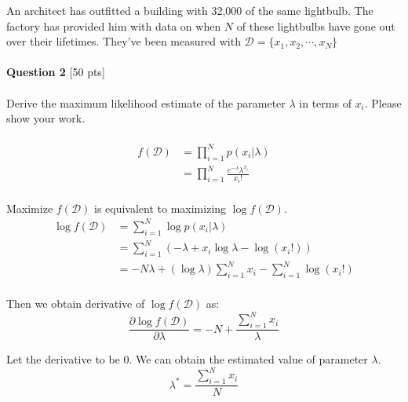 \documentclass[paper=a4, fontsize=11pt]{scrartcl} %
\begin{document}
An architect has outfitted a building with 32,000 of the same lightbulb. The factory has provided him with data on when $N$ of these lightbulbs have gone out over their lifetimes. They've been measured with $\mathcal{D} = \{ x_1, x_2, \cdots, x_N \}$\\
\\
{\Large \textbf{Question 2} [50 pts]} \\
\\
Derive the maximum likelihood estimate of the parameter $\lambda$ in terms of $x_i$. Please show your work. \\
\\
$$
\begin{aligned}
f(\mathcal{D}) &= \prod_{i=1}^{N}p(x_i|\lambda) \\
&= \prod_{i=1}^{N}\frac{e^{-\lambda}\lambda^{x_i}}{x_i!} \\
\end{aligned}
$$

Maximize $f(\mathcal{D})$ is equivalent to maximizing $\log f(\mathcal{D})$.
$$
\begin{aligned}
\log f(\mathcal{D}) &= \sum_{i=1}^{N}\log p(x_i|\lambda) \\
&= \sum_{i=1}^{N}\left( -\lambda + x_i\log\lambda -\log(x_i!) \right) \\
&= -N\lambda + (\log\lambda)\sum_{i=1}^{N}x_i - \sum_{i=1}^{N}\log(x_i!) \\
\end{aligned}
$$

Then we obtain derivative of $\log f(\mathcal{D})$ as:
$$
\frac{\partial \log f(\mathcal{D})}{\partial \lambda} = -N + \frac{\sum_{i=1}^{N}x_i}{\lambda}
$$

Let the derivative to be 0. We can obtain the estimated value of parameter $\lambda$.
$$
\lambda^\ast = \frac{\sum_{i=1}^{N}x_i}{N}
$$

\end{document}
